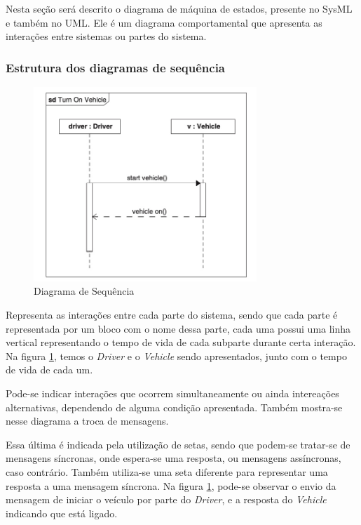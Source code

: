 Nesta seção será descrito o diagrama de máquina de estados, presente no SysML e também no UML. Ele é um diagrama comportamental que apresenta as interações entre sistemas ou partes do sistema.


\subsubsection{Estrutura dos diagramas de sequência}
\begin{figure}[H]
\centering
\includegraphics[width=0.75\textwidth]{figures/diagrama-sequencia.jpeg}
\caption{Diagrama de Sequência}
\label{fig:sequence_diagram}
\end{figure}
Representa as interações entre cada parte do sistema, sendo que cada parte é representada por um bloco com o nome dessa parte, cada uma possui uma linha vertical representando o tempo de vida de cada subparte durante certa interação. Na figura \ref{fig:sequence_diagram}, temos o \textit{Driver} e o \textit{Vehicle} sendo apresentados, junto com o tempo de vida de cada um. 

Pode-se indicar interações que ocorrem simultaneamente ou ainda intereações alternativas, dependendo de alguma condição apresentada. Também mostra-se nesse diagrama a troca de mensagens. 

Essa última é indicada pela utilização de setas, sendo que podem-se tratar-se de mensagens síncronas, onde espera-se uma resposta, ou mensagens assíncronas, caso contrário. Também utiliza-se uma seta diferente para representar uma resposta a uma mensagem síncrona. Na figura \ref{fig:sequence_diagram}, pode-se observar o envio da mensagem de iniciar o veículo por parte do \textit{Driver}, e a resposta do \textit{Vehicle} indicando que está ligado.

